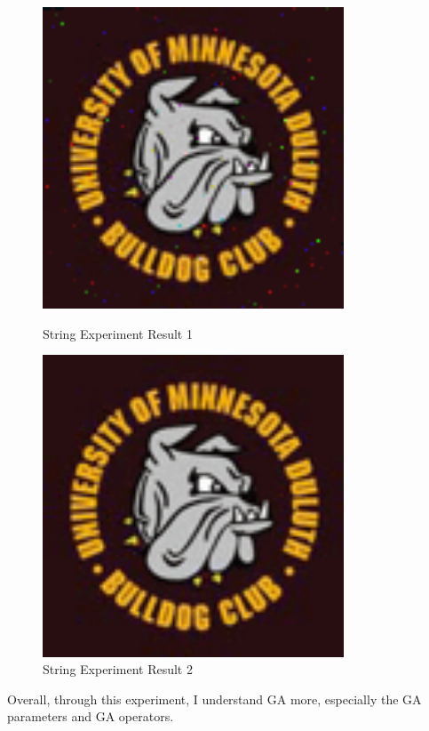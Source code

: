 \documentclass{article}
\begin{document}
\begin{figure}[ht]
    \centering
    \begin{minipage}{0.45\textwidth}
        \centering
        \includegraphics[width=0.8\textwidth]{bulldog000028} %
        \caption{String Experiment Result 1}
    \end{minipage}\hfill
    \begin{minipage}{0.45\textwidth}
        \centering
        \includegraphics[width=0.8\textwidth]{bulldog} %
        \caption{String Experiment Result 2}
    \end{minipage}
\end{figure}

Overall, through this experiment, I understand GA more, especially the GA parameters and GA operators.

\clearpage


\end{document}
